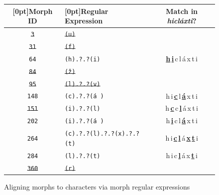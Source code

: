 {\begin{figure}[t]
\centering
\setlength{\extrarowheight}{6pt}
 \begin{tabular}{clc}
\toprule
\raisebox{0pt}[0pt]{Morph ID} & \raisebox{0pt}[0pt]{Regular Expression} & Match in \textit{hicl\'{a}xti}? \\
 \midrule
                \sout{\texttt{3}} & \sout{\texttt{(u)}} & \\
                \sout{\texttt{31}} &  \sout{\texttt{(f)}} &  \\
                \texttt{64} &  \texttt{(h).?.?(i)} & \textbf{\underline{h}\,\underline{i}\,}c\,l\,\'{a}\,x\,t\,i  \\
               \sout{\texttt{84}} &  \sout{\texttt{(\v{z})}} &  \\
                \sout{\texttt{95}} &  \sout{\texttt{(l).?.?(v)}} & \\ 
                \texttt{148} &   \texttt{(c).?.?(\'{a}\,)} & h\,i\,\textbf{\underline{c}}\,l\,\textbf{\underline{\'{a}}}\,x\,t\,i \\
                \sout{\texttt{151}}  &  \texttt{(i).?.?(l)} &  h\,\textbf{\underline{c}}\,c\,\textbf{\underline{l}}\,\'{a}\,x\,t\,i \\
                \texttt{202} &  \texttt{(i).?.?(\'{a}\,)} & h\,\textbf{\underline{i}}\,c\,l\,\textbf{\underline{\'{a}}}\,x\,t\,i \\
                \texttt{264} &  \texttt{(c).?.?(l).?.?(x).?.?(t)}  & h\,i\,\textbf{\underline{c}}\,\textbf{\underline{l}}\,\'{a}\,\textbf{\underline{x}}\,\textbf{\underline{t}}\,i \\
                \texttt{284} &  \texttt{(l).?.?(t)} & h\,i\,c\,\textbf{\underline{l}}\,\'{a}\,x\,\textbf{\underline{t}}\,i  \\
                \sout{\texttt{360}} &  \sout{\texttt{(r)}} & \\
       \bottomrule
 \end{tabular}
 \caption{Aligning morphs to characters via morph regular expressions}
  \label{fig:morph-regex}
\end{figure}

}
